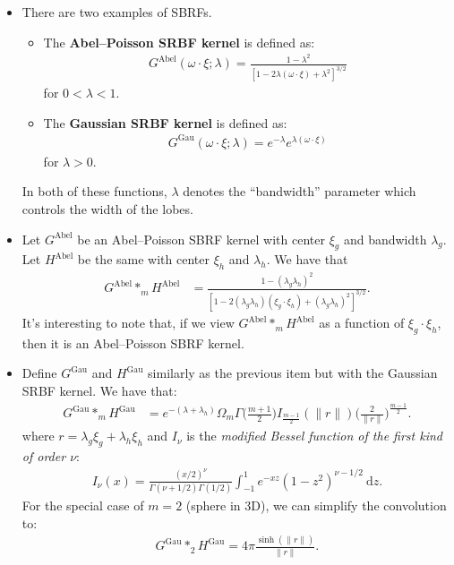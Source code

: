 \documentclass[10pt]{article}
\newcommand{\dee}{\mathrm{d}}
\newcommand{\mrm}[1]{\mathrm{#1}}
\begin{document}
\begin{itemize}
    \item There are two examples of SBRFs. 
    \begin{itemize}
      \item The \textbf{Abel--Poisson SRBF kernel} is defined as:
      \begin{align*}
        G^{\mrm{Abel}}(\omega \cdot \xi; \lambda) = \frac{1 - \lambda^2}{[1 - 2\lambda(\omega \cdot \xi) + \lambda^2]^{3/2}}    
      \end{align*}
      for $0 < \lambda < 1$.  
      \item The \textbf{Gaussian SRBF kernel} is defined as:
      \begin{align*}
        G^{\mrm{Gau}}(\omega \cdot \xi; \lambda) = e^{-\lambda} e^{\lambda(\omega \cdot \xi)}
      \end{align*}
      for $\lambda > 0$.      
    \end{itemize}
    In both of these functions, $\lambda$ denotes the ``bandwidth'' parameter which controls the width of the lobes.
    
    \item Let $G^{\mrm{Abel}}$ be an Abel--Poisson SBRF kernel with center $\xi_g$ and bandwidth $\lambda_g$. Let $H^{\mrm{Abel}}$ be the same with center $\xi_h$ and $\lambda_h$. We have that
    \begin{align*}
      G^{\mrm{Abel}} *_m H^{\mrm{Abel}} &= \frac{1 - (\lambda_g \lambda_h)^2}{[1 - 2(\lambda_g \lambda_h)(\xi_g \cdot \xi_h) + (\lambda_g \lambda_h)^2]^{3/2}}.
    \end{align*}
    It's interesting to note that, if we view $G^{\mrm{Abel}} *_m H^{\mrm{Abel}}$ as a function of $\xi_g \cdot \xi_h$, then it is an Abel--Poisson SBRF kernel.
    
    \item Define $G^{\mrm{Gau}}$ and $H^{\mrm{Gau}}$ similarly as the previous item but with the Gaussian SRBF kernel. We have that:
    \begin{align*}
      G^{\mrm{Gau}} *_m H^{\mrm{Gau}} &= e^{-(\lambda + \lambda_h)} \Omega_m \Gamma \bigg( \frac{m+1}{2} \bigg) I_{\frac{m-1}{2}}(\| r \|) \bigg( \frac{2}{\| r \|} \bigg)^{\frac{m-1}{2}}.
    \end{align*}
    where $r = \lambda_g \xi_g + \lambda_h \xi_h$ and $I_\nu$ is the \emph{modified Bessel function of the first kind of order $\nu$}:
    \begin{align*}
      I_\nu(x) = \frac{(x/2)^\nu}{\Gamma(\nu + 1/2) \Gamma(1/2)} \int_{-1}^1 e^{-xz} (1-z^2)^{\nu - 1/2}\ \dee z.
    \end{align*}
    For the special case of $m = 2$ (sphere in 3D), we can simplify the convolution to:
    \begin{align*}
       G^{\mrm{Gau}} *_2 H^{\mrm{Gau}} = 4\pi \frac{\sinh(\| r \|)}{\| r \|}.
    \end{align*}
    

\end{itemize}
\end{document}
